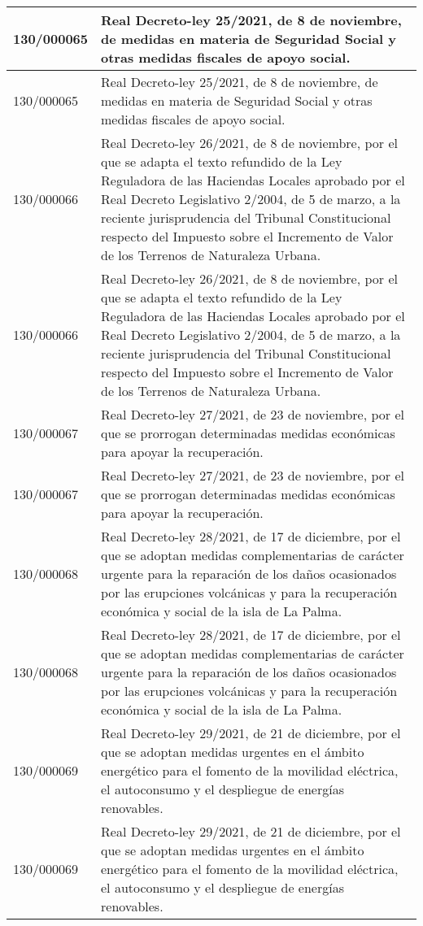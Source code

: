 {\begin{table}[H]
\begin{center}
\begin{tabularx}{\linewidth}{| l | X |}
\hline
130/000065 & Real Decreto-ley 25/2021, de 8 de noviembre, de medidas en materia de Seguridad Social y otras medidas fiscales de apoyo social. \\
\hline
130/000065 & Real Decreto-ley 25/2021, de 8 de noviembre, de medidas en materia de Seguridad Social y otras medidas fiscales de apoyo social. \\
\hline
130/000066 & Real Decreto-ley 26/2021, de 8 de noviembre, por el que se adapta el texto refundido de la Ley Reguladora de las Haciendas Locales aprobado por el Real Decreto Legislativo 2/2004, de 5 de marzo, a la reciente jurisprudencia del Tribunal Constitucional respecto del Impuesto sobre el Incremento de Valor de los Terrenos de Naturaleza Urbana. \\
\hline
130/000066 & Real Decreto-ley 26/2021, de 8 de noviembre, por el que se adapta el texto refundido de la Ley Reguladora de las Haciendas Locales aprobado por el Real Decreto Legislativo 2/2004, de 5 de marzo, a la reciente jurisprudencia del Tribunal Constitucional respecto del Impuesto sobre el Incremento de Valor de los Terrenos de Naturaleza Urbana. \\
\hline
130/000067 & Real Decreto-ley 27/2021, de 23 de noviembre, por el que se prorrogan determinadas medidas económicas para apoyar la recuperación. \\
\hline
130/000067 & Real Decreto-ley 27/2021, de 23 de noviembre, por el que se prorrogan determinadas medidas económicas para apoyar la recuperación. \\
\hline
130/000068 & Real Decreto-ley 28/2021, de 17 de diciembre, por el que se adoptan medidas complementarias de carácter urgente para la reparación de los daños ocasionados por las erupciones volcánicas y para la recuperación económica y social de la isla de La Palma. \\
\hline
130/000068 & Real Decreto-ley 28/2021, de 17 de diciembre, por el que se adoptan medidas complementarias de carácter urgente para la reparación de los daños ocasionados por las erupciones volcánicas y para la recuperación económica y social de la isla de La Palma. \\
\hline
130/000069 & Real Decreto-ley 29/2021, de 21 de diciembre, por el que se adoptan medidas urgentes en el ámbito energético para el fomento de la movilidad eléctrica, el autoconsumo y el despliegue de energías renovables. \\
\hline
130/000069 & Real Decreto-ley 29/2021, de 21 de diciembre, por el que se adoptan medidas urgentes en el ámbito energético para el fomento de la movilidad eléctrica, el autoconsumo y el despliegue de energías renovables. \\

\end{tabularx}
\end{center}
\end{table}}
